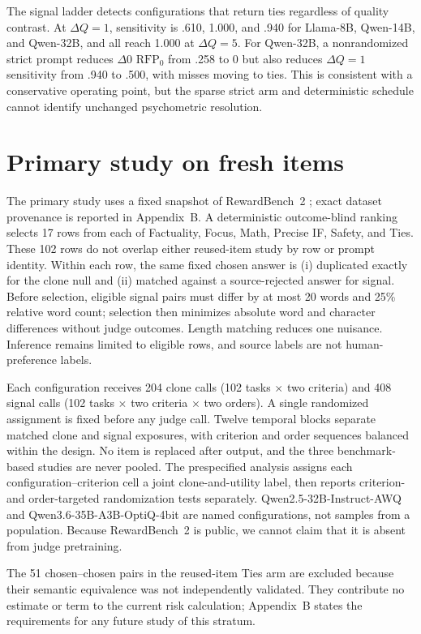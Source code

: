 \documentclass[10pt]{article}
\newcommand{\RFP}{\ensuremath{\mathrm{RFP}_{0}}}
\begin{document}
The signal ladder detects configurations that return ties regardless of quality contrast. At $\Delta Q=1$, sensitivity is .610, 1.000, and .940 for Llama-8B, Qwen-14B, and Qwen-32B, and all reach 1.000 at $\Delta Q=5$. For Qwen-32B, a nonrandomized strict prompt reduces $\Delta0$ \RFP{} from .258 to 0 but also reduces $\Delta Q=1$ sensitivity from .940 to .500, with misses moving to ties. This is consistent with a conservative operating point, but the sparse strict arm and deterministic schedule cannot identify unchanged psychometric resolution.

\section{Primary study on fresh items}

The primary study uses a fixed snapshot of RewardBench~2 \citep{malik2026rewardbench2}; exact dataset provenance is reported in Appendix~B. A deterministic outcome-blind ranking selects 17 rows from each of Factuality, Focus, Math, Precise IF, Safety, and Ties. These 102 rows do not overlap either reused-item study by row or prompt identity. Within each row, the same fixed chosen answer is (i) duplicated exactly for the clone null and (ii) matched against a source-rejected answer for signal. Before selection, eligible signal pairs must differ by at most 20 words and 25\% relative word count; selection then minimizes absolute word and character differences without judge outcomes. Length matching reduces one nuisance. Inference remains limited to eligible rows, and source labels are not human-preference labels.

Each configuration receives 204 clone calls (102 tasks $\times$ two criteria) and 408 signal calls (102 tasks $\times$ two criteria $\times$ two orders). A single randomized assignment is fixed before any judge call. Twelve temporal blocks separate matched clone and signal exposures, with criterion and order sequences balanced within the design. No item is replaced after output, and the three benchmark-based studies are never pooled. The prespecified analysis assigns each configuration--criterion cell a joint clone-and-utility label, then reports criterion- and order-targeted randomization tests separately. Qwen2.5-32B-Instruct-AWQ and Qwen3.6-35B-A3B-OptiQ-4bit are named configurations, not samples from a population. Because RewardBench~2 is public, we cannot claim that it is absent from judge pretraining.

The 51 chosen--chosen pairs in the reused-item Ties arm are excluded because their semantic equivalence was not independently validated. They contribute no estimate or term to the current risk calculation; Appendix~B states the requirements for any future study of this stratum.
\end{document}

